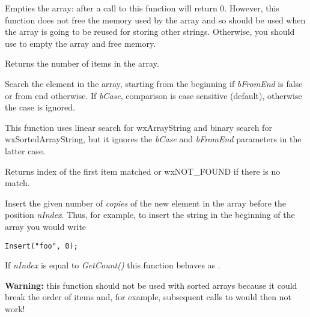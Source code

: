 \label{wxarraystringempty}


Empties the array: after a call to this function 
 will return $0$. However, this
function does not free the memory used by the array and so should be used when
the array is going to be reused for storing other strings. Otherwise, you
should use  to empty the array and free
memory.

\label{wxarraystringgetcount}


Returns the number of items in the array.

\label{wxarraystringindex}


Search the element in the array, starting from the beginning if
{\it bFromEnd} is false or from end otherwise. If {\it bCase}, comparison is
case sensitive (default), otherwise the case is ignored.

This function uses linear search for wxArrayString and binary search for
wxSortedArrayString, but it ignores the {\it bCase} and {\it bFromEnd} 
parameters in the latter case.

Returns index of the first item matched or wxNOT\_FOUND if there is no match.

\label{wxarraystringinsert}


Insert the given number of {\it copies} of the new element in the array before the position {\it nIndex}. Thus, for
example, to insert the string in the beginning of the array you would write

\begin{verbatim}
Insert("foo", 0);
\end{verbatim}

If {\it nIndex} is equal to {\it GetCount()} this function behaves as 
.

{\bf Warning:} this function should not be used with sorted arrays because it
could break the order of items and, for example, subsequent calls to 
 would then not work!

